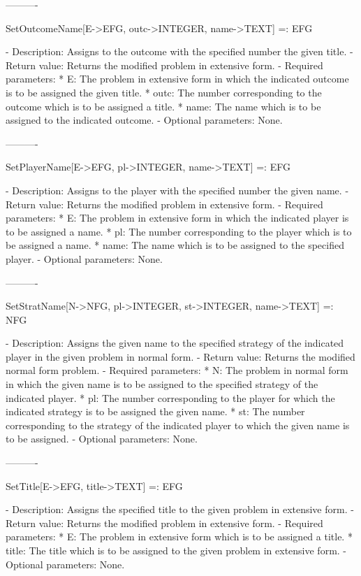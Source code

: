 ----------

SetOutcomeName[E->EFG, outc->INTEGER, name->TEXT] =: EFG

   -	Description:  Assigns to the outcome with the specified number the 
	given title.
   -	Return value:  Returns the modified problem in extensive form.
   -	Required parameters:
	  *  E:  The problem in extensive form in which the indicated outcome 
		is to be assigned the given title.
	  *  outc:  The number corresponding to the outcome which is to be 
		assigned a title.
	  *  name:  The name which is to be assigned to the indicated outcome.
   -	Optional parameters:  None.

----------

SetPlayerName[E->EFG, pl->INTEGER, name->TEXT] =: EFG

   -	Description:  Assigns to the player with the specified number the given
	name.
   -	Return value:  Returns the modified problem in extensive form.
   -	Required parameters:
	  *  E:  The problem in extensive form in which the indicated player is
		to be assigned a name.
	  *  pl:  The number corresponding to the player which is to be 
		assigned a name.
	  *  name:  The name which is to be assigned to the specified player.
   -	Optional parameters:  None.

----------

SetStratName[N->NFG, pl->INTEGER, st->INTEGER, name->TEXT] =: NFG

   -	Description:  Assigns the given name to the specified strategy of the
	indicated player in the given problem in normal form.
   -	Return value:  Returns the modified normal form problem.
   -	Required parameters:
	  *  N:  The problem in normal form in which the given name is to be
		assigned to the specified strategy of the indicated player.
	  *  pl:  The number corresponding to the player for which the 
		indicated strategy is to be assigned the given name.
	  *  st:  The number corresponding to the strategy of the indicated 
		player to which the given name is to be assigned.
   -	Optional parameters:  None.

----------

SetTitle[E->EFG, title->TEXT] =: EFG

   -	Description:  Assigns the specified title to the given problem in 
	extensive form.
   -	Return value:  Returns the modified problem in extensive form.
   -	Required parameters:
	  *  E:  The problem in extensive form which is to be assigned a title.
	  *  title:  The title which is to be assigned to the given problem in 
		extensive form.
  -	Optional parameters:  None.

